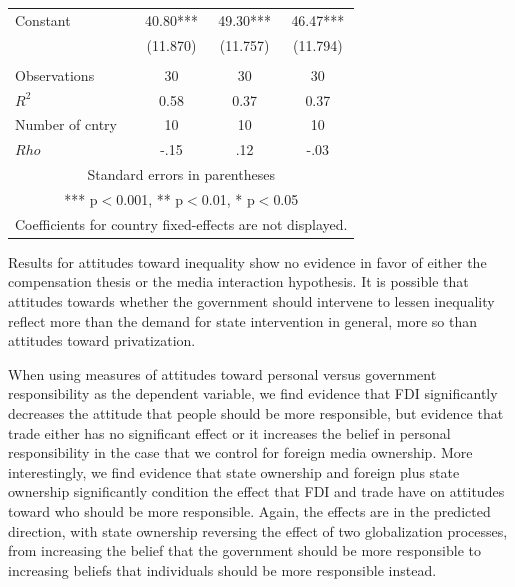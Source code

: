 \documentclass[12pt]{report}
\begin{document}
\begin{table}[htdp]
\begin{center}
{\begin{tabular}{lccc}
Constant & 40.80*** & 49.30*** & 46.47*** \\  & (11.870) &
(11.757) & (11.794) \\
 &  &  &
 \\ Observations & 30 & 30 & 30 \\ $R^2$ & 0.58 & 0.37 & 0.37
\\ Number of cntry & 10 & 10 & 10 \\  $Rho$ & -.15 & .12 & -.03 \\ \hline
\multicolumn{4}{c}{ Standard errors in parentheses} \\
\multicolumn{4}{c}{ *** p$<$0.001, ** p$<$0.01, * p$<$0.05} \\
\multicolumn{4}{c}{ Coefficients for country fixed-effects are not displayed.
} \\
\end{tabular}
} \end{center}
\label{default}
\end{table}

Results for attitudes toward inequality show no evidence in favor of either the compensation thesis
or the media interaction hypothesis. It is possible that attitudes towards whether the government
should intervene to lessen inequality reflect more than the demand for state intervention in
general, more so than attitudes toward privatization.

When using measures of attitudes toward personal versus government responsibility as the dependent
variable, we find evidence that FDI significantly decreases the attitude that people should be more
responsible, but evidence that trade either has no significant effect or it increases the belief in
personal responsibility in the case that we control for foreign media ownership. More interestingly,
we find evidence that state ownership and foreign plus state ownership significantly condition the
effect that FDI and trade have on attitudes toward who should be more responsible. Again, the
effects are in the predicted direction, with state ownership reversing the effect of two
globalization processes, from increasing the belief that the government should be more responsible
to increasing beliefs that individuals should be more responsible instead.
\end{document}
